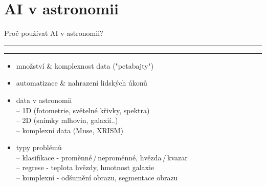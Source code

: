 \documentclass[aspectratio=43]{beamer}
\def\vs{\vspace{-2mm}}
\def\lend{\phantom{g}\vspace{1.5mm}\hrule\hrule}
\begin{document}
\section{AI v astronomii}

\begin{frame}{\vs Proč používat AI v astronomii? \lend}
\vspace{3mm}
\begin{itemize}
    \item<1-> množství \& komplexnost data ("petabajty")\\ \vspace{3mm}
    \item<1-> automatizace \& nahrazení lidských úkonů\\ \vspace{3mm}
    \item<2-> data v astronomii\\ \vspace{2mm}
        -- 1D (fotometrie, světelné křivky, spektra)\\ \vspace{2mm}
        -- 2D (snímky mlhovin, galaxií..)\\ \vspace{2mm}
        -- komplexní data (Muse, XRISM)\\ \vspace{3mm}
    \item<2-> typy problémů\\ \vspace{2mm}
        -- klasifikace - proměnné\,/\,neproměnné, hvězda\,/\,kvazar\\ \vspace{2mm}
        -- regrese - teplota hvězdy, hmotnost galaxie\\ \vspace{2mm}
        -- komplexní - odšumění obrazu, segmentace obrazu
\end{itemize}
\end{frame}
\end{document}
